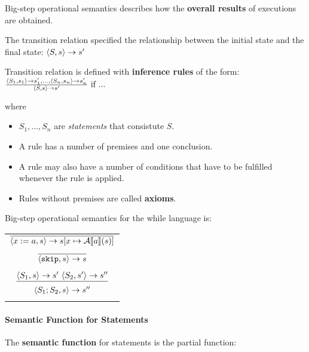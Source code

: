 Big-step operational semantics describes how the \textbf{overall
  results} of executions are obtained.

The transition relation specified the relationship between the initial
state and the final state: $ \langle  S, s  \rangle \to s' $

Transition relation is defined with \textbf{inference rules} of the
form:
\\

\begin{math}
\frac{ \langle  S_1, s_1 \rangle \to s_1', ..., \langle  S_n, s_n \rangle \to s_n' }
{ \langle S, s \rangle \to s' }
\text{ if ... }
\end{math}

where

\begin{itemize}
\item $ S_1, ..., S_n $ are \textsl{statements} that consistute $ S $.
\item A rule has a number of premises and one conclusion.
\item A rule may also have a number of conditions that have to be
  fulfilled whenever the rule is applied.
\item Rules without premises are called \textbf{axioms}.
\end{itemize}

Big-step operational semantics for the while language is:


\begin{tabularx}{\textwidth}{c}
\\
$ \overline{ \langle  x := a, s  \rangle \to s [ x \mapsto \mathcal{A}\llbracket a \rrbracket(s) ] } $\\
\\
$ \overline{ \langle  \mathtt{skip}, s \rangle \to s } $\\
\\

$ \underline{ \langle S_1, s \rangle \to s' \text{   } \langle S_2, s' \rangle \to s''} $ \\
$ \langle S_1;S_2, s \rangle \to s'' $ \\
\\

\end{tabularx}


\paragraph{Semantic Function for Statements}

The \textbf{semantic function} for statements is the partial function:

